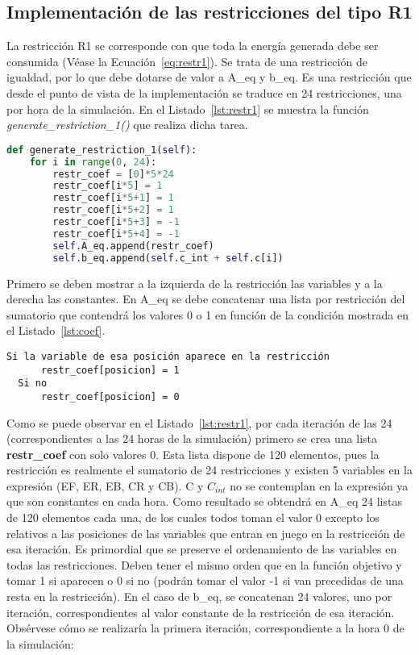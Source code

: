 \subsection{Implementación de las restricciones del tipo R1}
La restricción R1 se corresponde con que toda la energía generada debe ser consumida (Véase la Ecuación~\ref{eq:restr1}). Se trata de una restricción de igualdad, por lo que debe dotarse de valor a A\_eq y b\_eq. Es una restricción que desde el punto de vista de la implementación se traduce en 24 restricciones, una por hora de la simulación. En el Listado~\ref{lst:restr1} se muestra la función \textit{generate\_restriction\_1()} que realiza dicha tarea.\\
\begin{lstlisting}[language=Python,float=ht,caption={Restricciones del tipo R1},label={lst:restr1}]
def generate_restriction_1(self):
    for i in range(0, 24):
        restr_coef = [0]*5*24
        restr_coef[i*5] = 1
        restr_coef[i*5+1] = 1
        restr_coef[i*5+2] = 1
        restr_coef[i*5+3] = -1
        restr_coef[i*5+4] = -1
        self.A_eq.append(restr_coef)
        self.b_eq.append(self.c_int + self.c[i])
\end{lstlisting}

Primero se deben mostrar a la izquierda de la restricción las variables y a la derecha las constantes. En A\_eq se debe concatenar una lista por restricción del sumatorio que contendrá los valores 0 o 1 en función de la condición mostrada en el Listado~\ref{lst:coef}.\\

\begin{lstlisting}[numbers=none,float=ht,caption={Condición para dotar de valor los coeficientes},label={lst:coef}]
  Si la variable de esa posición aparece en la restricción
      restr_coef[posicion] = 1
  Si no
      restr_coef[posicion] = 0
\end{lstlisting}
Como se puede observar en el Listado~\ref{lst:restr1}, por cada iteración de las 24 (correspondientes a las 24 horas de la simulación) primero se crea una lista \textbf{restr\_coef} con solo valores 0. Esta lista dispone de 120 elementos, pues la restricción es realmente el sumatorio de 24 restricciones y existen 5 variables en la expresión (EF, ER, EB, CR y CB). C y $ C_{int}$ no se contemplan en la expresión ya que son constantes en cada hora. Como resultado se obtendrá en A\_eq 24 listas de 120 elementos cada una, de los cuales todos toman el valor 0 excepto los relativos a las posiciones de las variables que entran en juego en la restricción de esa iteración. Es primordial que se preserve el ordenamiento de las variables en todas las restricciones. Deben tener el mismo orden que en la función objetivo y tomar 1 si aparecen o 0 si no (podrán tomar el valor -1 si van precedidas de una resta en la restricción). En el caso de b\_eq, se concatenan 24 valores, uno por iteración, correspondientes al valor constante de la restricción de esa iteración. Obsérvese cómo se realizaría la primera iteración, correspondiente a la hora 0 de la simulación:\\

